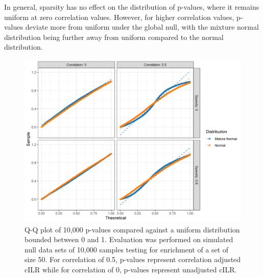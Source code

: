 \documentclass{article}
\begin{document}
In general, sparsity has no effect on the distribution of p-values, where it remains uniform at zero correlation values. However, for higher correlation values, p-values deviate more from uniform under the global null, with the mixture normal distribution being further away from uniform compared to the normal distribution. 

\begin{figure}[!ht]
    \centering
    \includegraphics[width=\textwidth]{figures/pval_distr.png}
    \caption{Q-Q plot of 10,000 p-values compared against a uniform distribution bounded between 0 and 1. Evaluation was performed on simulated null data sets of 10,000 samples testing for enrichment of a set of size 50. For correlation of 0.5, p-values represent correlation adjusted cILR while for correlation of 0, p-values represent unadjusted cILR.}
    \label{fig:s7}
\end{figure}

\newpage
{}

\end{document}
